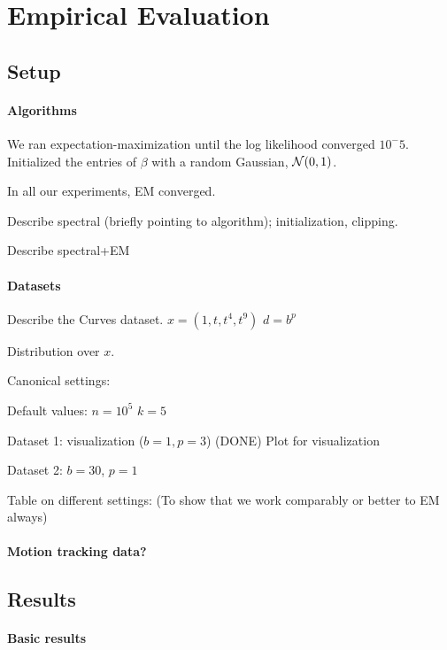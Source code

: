\section{Empirical Evaluation}
\label{sec:evaluation}

\subsection{Setup}

\paragraph{Algorithms}

We ran expectation-maximization until the log likelihood converged
$10^-5$. Initialized the entries of $\beta$ with a random Gaussian, $\mathcal{N}(0, 1)$.

In all our experiments, EM converged.

Describe spectral (briefly pointing to algorithm);
initialization, clipping.

Describe spectral+EM

\paragraph{Datasets}
Describe the Curves dataset.
$x = (1, t, t^4, t^9)$
$d = b^p$

Distribution over $x$.

Canonical settings:

Default values:
$n = 10^5$
$k = 5$

Dataset 1: visualization ($b = 1, p = 3$) (DONE)
Plot for visualization

Dataset 2: $b = 30$, $p = 1$

Table on different settings: 
  (To show that we work comparably or better to EM always)


\paragraph{Motion tracking data?}

\subsection{Results}

\paragraph{Basic results}

